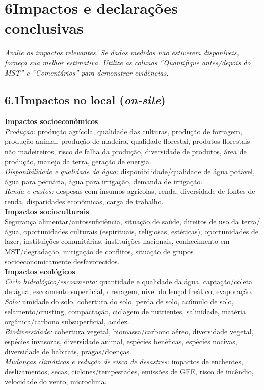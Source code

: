 \section{6\quad Impactos e declarações conclusivas}

\textit{Avalie os impactos relevantes. Se dados medidos não estiverem disponíveis, forneça sua melhor estimativa. Utilize as colunas ``Quantifique antes/depois do MST'' e ``Comentários'' para demonstrar evidências.}

\subsection{6.1\quad Impactos no local (\textit{on-site})}

\noindent\textbf{Impactos socioeconômicos}\\[2pt]
\textit{Produção:} produção agrícola, qualidade das culturas, produção de forragem, produção animal, produção de madeira, qualidade florestal, produtos florestais não madeireiros, risco de falha da produção, diversidade de produtos, área de produção, manejo da terra, geração de energia.\\[4pt]
\textit{Disponibilidade e qualidade da água:} disponibilidade/qualidade de água potável, água para pecuária, água para irrigação, demanda de irrigação.\\[4pt]
\textit{Renda e custos:} despesas com insumos agrícolas, renda, diversidade de fontes de renda, disparidades econômicas, carga de trabalho.\\[6pt]
\noindent\textbf{Impactos socioculturais}\\[2pt]
Segurança alimentar/autossuficiência, situação de saúde, direitos de uso da terra/água, oportunidades culturais (espirituais, religiosas, estéticas), oportunidades de lazer, instituições comunitárias, instituições nacionais, conhecimento em MST/degradação, mitigação de conflitos, situação de grupos socioeconomicamente desfavorecidos.\\[6pt]
\noindent\textbf{Impactos ecológicos}\\[2pt]
\textit{Ciclo hidrológico/escoamento:} quantidade e qualidade da água, captação/coleta de água, escoamento superficial, drenagem, nível do lençol freático, evaporação.\\[4pt]
\textit{Solo:} umidade do solo, cobertura do solo, perda de solo, acúmulo de solo, selamento/crusting, compactação, ciclagem de nutrientes, salinidade, matéria orgânica/carbono subsuperficial, acidez.\\[4pt]
\textit{Biodiversidade:} cobertura vegetal, biomassa/carbono aéreo, diversidade vegetal, espécies invasoras, diversidade animal, espécies benéficas, espécies nocivas, diversidade de habitats, pragas/doenças.\\[4pt]
\textit{Mudanças climáticas e redução de risco de desastres:} impactos de enchentes, deslizamentos, secas, ciclones/tempestades, emissões de GEE, risco de incêndio, velocidade do vento, microclima.

